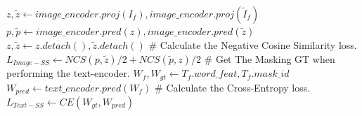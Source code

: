 \begin{algorithm}
\begin{algorithmic}[1]
        \EndFunction
        \State
            \State $z, \tilde{z} \gets image\_encoder.proj(I_f), image\_encoder.proj(\tilde{I}_f)$
            \State $p, \tilde{p} \gets image\_encoder.pred(z), image\_encoder.pred(\tilde{z})$
            \State $z, \tilde{z} \gets z.detach(), \tilde{z}.detach()$
            \State \textcolor[RGB]{64,128,128}{$\#$ Calculate the Negative Cosine Similarity loss.}
            \State $L_{Image-SS} \gets NCS(p, \tilde{z}) / 2 + NCS(\tilde{p}, z) / 2$  
            \State {}
        \EndFunction
        \State
            \State \textcolor[RGB]{64,128,128}{$\#$ Get The Masking GT when performing the text-encoder.}
            \State $W_f, W_{gt} \gets T_f.word\_feat, T_f.mask\_id$
            \State $W_{pred} \gets text\_encoder.pred(W_f)$
            \State \textcolor[RGB]{64,128,128}{$\#$ Calculate the Cross-Entropy loss.}
            \State $L_{Text-SS} \gets CE(W_{gt}, W_{pred})$  
            \State {}
        \EndFunction
        
    \end{algorithmic}
\end{algorithm}
